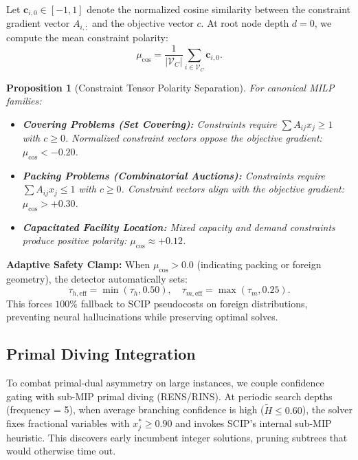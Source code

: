 \documentclass[10pt,twocolumn,letterpaper]{article}
\theoremstyle{plain}
\newtheorem{proposition}[theorem]{Proposition}
\theoremstyle{definition}
\theoremstyle{remark}
\begin{document}
Let $\mathbf{c}_{i, 0} \in [-1, 1]$ denote the normalized cosine similarity between the constraint gradient vector $A_{i, :}$ and the objective vector $c$. At root node depth $d = 0$, we compute the mean constraint polarity:
\begin{equation}
    \mu_{\text{cos}} = \frac{1}{|\mathcal{V}_C|} \sum_{i \in \mathcal{V}_C} \mathbf{c}_{i, 0}. \label{eq:root_polarity}
\end{equation}

\begin{proposition}[Constraint Tensor Polarity Separation]
For canonical MILP families:
\begin{itemize}
    \item \textbf{Covering Problems (Set Covering):} Constraints require $\sum A_{ij} x_j \ge 1$ with $c \ge 0$. Normalized constraint vectors oppose the objective gradient: $\mu_{\text{cos}} < -0.20$.
    \item \textbf{Packing Problems (Combinatorial Auctions):} Constraints require $\sum A_{ij} x_j \le 1$ with $c \ge 0$. Constraint vectors align with the objective gradient: $\mu_{\text{cos}} > +0.30$.
    \item \textbf{Capacitated Facility Location:} Mixed capacity and demand constraints produce positive polarity: $\mu_{\text{cos}} \approx +0.12$.
\end{itemize}
\end{proposition}

\textbf{Adaptive Safety Clamp:} When $\mu_{\text{cos}} > 0.0$ (indicating packing or foreign geometry), the detector automatically sets:
\begin{equation}
    \tau_{h,\text{eff}} = \min(\tau_h, 0.50), \quad \tau_{m,\text{eff}} = \max(\tau_m, 0.25).
\end{equation}
This forces $100\%$ fallback to SCIP pseudocosts on foreign distributions, preventing neural hallucinations while preserving optimal solves.

\subsection{Primal Diving Integration}
To combat primal-dual asymmetry on large instances, we couple confidence gating with sub-MIP primal diving (RENS/RINS). At periodic search depths (frequency = 5), when average branching confidence is high ($\tilde{H} \le 0.60$), the solver fixes fractional variables with $x_j^* \ge 0.90$ and invokes SCIP's internal sub-MIP heuristic. This discovers early incumbent integer solutions, pruning subtrees that would otherwise time out.
\end{document}
